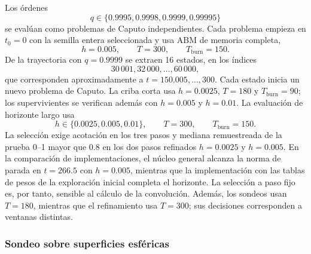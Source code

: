 Los órdenes
\[
q\in\{0.9995,0.9998,0.9999,0.99995\}
\]
se evalúan como problemas de Caputo independientes. Cada problema empieza en
\(t_0=0\) con la semilla entera seleccionada y usa ABM de memoria completa,
\[
h=0.005,\qquad T=300,\qquad T_{\mathrm{burn}}=150.
\]
De la trayectoria con \(q=0.9999\) se extraen 16 estados, en los índices
\[
30\,001,32\,000,\ldots,60\,000,
\]
que corresponden aproximadamente a \(t=150.005,\ldots,300\). Cada estado
inicia un nuevo problema de Caputo. La criba corta usa \(h=0.0025\),
\(T=180\) y \(T_{\mathrm{burn}}=90\); los supervivientes se verifican además
con \(h=0.005\) y \(h=0.01\). La evaluación de horizonte largo usa
\[
h\in\{0.0025,0.005,0.01\},\qquad
T=300,\qquad T_{\mathrm{burn}}=150.
\]
La selección exige acotación en los tres pasos y mediana remuestreada de la
prueba 0--1 mayor que 0.8 en los dos pasos refinados
\(h=0.0025\) y \(h=0.005\).
En la comparación de implementaciones, el núcleo general alcanza la norma
de parada en \(t=266.5\) con \(h=0.005\), mientras que la implementación
con las tablas de pesos de la exploración inicial completa el horizonte.
La selección a paso fijo es, por tanto, sensible al cálculo de la convolución.
Además, los sondeos usan \(T=180\), mientras que el refinamiento usa
\(T=300\); sus decisiones corresponden a ventanas distintas.

\subsubsection{Sondeo sobre superficies esféricas}


